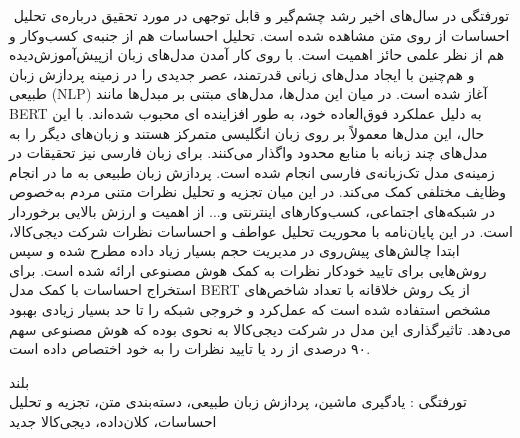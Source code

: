 

\pagestyle{empty}
‌
‌تورفتگی
در سال‌های اخیر رشد چشم‌گیر و قابل توجهی در مورد تحقیق درباره‌ی تحلیل احساسات از روی متن مشاهده شده است. تحلیل احساسات هم از جنبه‌ی کسب‌وکار و هم از نظر علمی حائز اهمیت است.
با روی کار آمدن مدل‌های زبان از‌پیش‌آموزش‌دیده و هم‌چنین با ایجاد مدل‌های زبانی قدرتمند، عصر جدیدی را در زمینه پردازش زبان طبیعی (NLP) آغاز شده است. در میان این مدل‌ها، مدل‌های مبتنی بر مبدل‌ها مانند BERT به دلیل عملکرد فوق‌العاده خود، به طور افزاینده‌
ای محبوب شده‌اند.
با این حال، این مدل‌ها معمولاً بر روی زبان انگلیسی متمرکز هستند و زبان‌های دیگر را به مدل‌های چند زبانه با منابع محدود واگذار می‌کنند. برای زبان فارسی نیز تحقیقات در زمینه‌ی مدل تک‌زبانه‌ی فارسی انجام شده است.
پردازش زبان طبیعی به ما در انجام وظایف مختلفی کمک می‌کند. در این میان تجزیه و تحلیل نظرات متنی مردم به‌خصوص در شبکه‌های اجتماعی، کسب‌وکارهای اینترنتی و... از اهمیت و ارزش بالایی برخوردار است. 
در این پایان‌نامه با محوریت تحلیل عواطف و احساسات نظرات شرکت دیجی‌کالا، ابتدا چالش‌های پیش‌روی در مدیریت حجم بسیار زیاد داده مطرح شده و سپس روش‌هایی برای تایید خودکار نظرات به کمک هوش مصنوعی ارائه شده است. برای استخراج احساسات با کمک مدل 
BERT
 از یک روش خلاقانه با تعداد شاخص‌های مشخص استفاده شده است که عمل‌کرد و خروجی شبکه را تا حد بسیار زیادی بهبود می‌دهد. تاثیرگذاری این مدل در شرکت دیجی‌کالا به نحوی بوده که هوش مصنوعی سهم ۹۰ درصدی از رد یا تایید نظرات را به خود اختصاص داده است.
	
‌بلند
\\
‌تورفتگی : 
یادگیری ماشین، پردازش زبان طبیعی، دسته‌بندی متن، تجزیه و تحلیل احساسات، کلان‌داده، دیجی‌کالا
‌جدید
